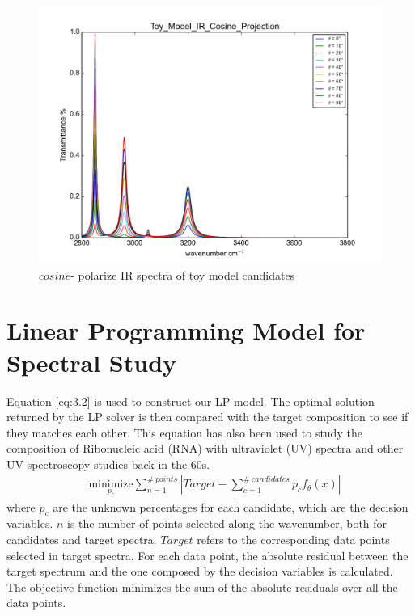 \begin{figure}[!ht] 
\centering
\includegraphics[scale=0.4]{Figures/Toy_Model_IR_Cosine_Projection.png} 
\caption{$cosine$- polarize IR spectra of toy model candidates} \label{fig:3.1}
\end{figure}


\section{Linear Programming Model for Spectral Study}

Equation \ref{eq:3.2} is used to construct our LP model. The optimal solution returned by the LP solver is then compared with the target composition to see if they matches each other. This equation has also been used to study the composition of Ribonucleic acid (RNA) with ultraviolet (UV) spectra \cite{NYAS:NYAS900} and other UV spectroscopy studies  \cite{LPATUAS} back in the 60s. \\

\begin{eqnarray} \label{eq:3.2}
& \underset{p_{c}} {\text{minimize}} \displaystyle\sum^{\#~points}_{n=1} \left| Target- \displaystyle\sum^{\#~candidates}_{c=1}p_{c}f_{\theta}(x) \right| 
\end{eqnarray}
where $p_{c}$ are the unknown percentages for each candidate, which are the decision variables. $n$ is the number of points selected along the wavenumber, both for candidates and target spectra. $Target$ refers to the corresponding data points selected in target spectra. For each data point, the absolute residual between the target spectrum and the one composed by the decision variables is calculated. The objective function minimizes the sum of the absolute residuals over all the data points. \\

